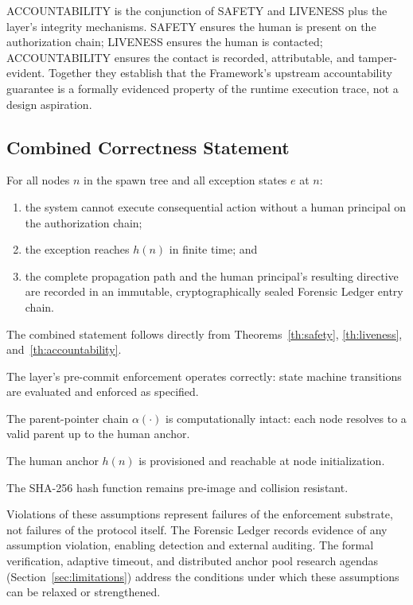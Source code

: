 ACCOUNTABILITY is the conjunction of SAFETY and LIVENESS plus the \fact{}
layer's integrity mechanisms.  SAFETY ensures the human is present on the
authorization chain; LIVENESS ensures the human is contacted; ACCOUNTABILITY
ensures the contact is recorded, attributable, and tamper-evident.  Together they
establish that the \bxthree{} Framework's upstream accountability guarantee is a
formally evidenced property of the runtime execution trace, not a design
aspiration.

\subsection{Combined Correctness Statement}
\label{sec:combined-correctness}

\begin{maintheorem}
\label{th:combined-correctness}
For all nodes $n$ in the spawn tree and all exception states $e$ at $n$:
\begin{enumerate}
\item[SAFETY:] the system cannot execute consequential action without a human
principal on the authorization chain;
\item[LIVENESS:] the exception reaches $h(n)$ in finite time; and
\item[ACCOUNTABILITY:] the complete propagation path and the human principal's
resulting directive are recorded in an immutable, cryptographically sealed
Forensic Ledger entry chain.
\end{enumerate}
\end{maintheorem}

The combined statement follows directly from Theorems~\ref{th:safety},
\ref{th:liveness}, and~\ref{th:accountability}.

\begin{conditions-list}
\item The \fact{} layer's pre-commit enforcement operates correctly: state
machine transitions are evaluated and enforced as specified.
\item The parent-pointer chain $\alpha(\cdot)$ is computationally intact: each
node resolves to a valid parent up to the human anchor.
\item The human anchor $h(n)$ is provisioned and reachable at node initialization.
\item The SHA-256 hash function remains pre-image and collision resistant.
\end{conditions-list}

Violations of these assumptions represent failures of the enforcement
substrate, not failures of the protocol itself.  The Forensic Ledger records
evidence of any assumption violation, enabling detection and external auditing.
The formal verification, adaptive timeout, and distributed anchor pool research
agendas (Section~\ref{sec:limitations}) address the conditions under which these
assumptions can be relaxed or strengthened.
